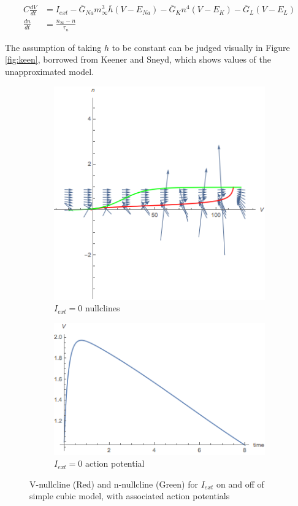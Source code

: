 \documentclass{article}
\begin{document}
\begin{align*}
        C\frac{dV}{dt} &= I_{ext} -\bar{G}_{Na}m_\infty^3\bar{h}(V-E_{Na}) -\bar{G}_{K}n^4(V-E_{K})  -\bar{G}_{L}(V-E_{L}) \\
    \frac{dn}{dt} &= \frac{n_{\infty}-n}{\tau_n} 
\end{align*}

The assumption of taking $h$ to be constant can be judged visually in Figure \ref{fig:keen}, borrowed from Keener and Sneyd, which shows values of the unapproximated model\cite{keener}.

\begin{figure}
\centering
\begin{subfigure}{\textwidth}
	\centering
	\includegraphics[width=10cm]{fastFast_nullc.png}
	\caption{$I_{ext}=0$ nullclines}
\end{subfigure}
\begin{subfigure}{\textwidth}
	\centering
	\includegraphics[width=10cm]{fastFast.png}
	\caption{$I_{ext}=0$ action potential}
\end{subfigure}
	\caption{V-nullcline (Red) and n-nullcline (Green) for $I_{ext}$ on and off of simple cubic model, with associated action potentials}
	\label{fig:first}
\end{figure}
\end{document}

